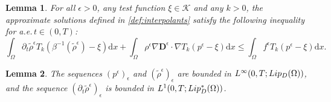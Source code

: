 \documentclass[10pt,a4paper]{amsart}
\newtheorem{lemma}{Lemma}
\newcommand{\K}{\mathcal K}
\newcommand{\Lip}{\textup{Lip}}
\newcommand{\Om}{\Omega}
\newcommand{\dd}{\mathrm{d}}
\newcommand{\de}{\mathbf{D}}
\newcommand{\pp}{a.e.\,}
\begin{document}
\begin{lemma}\label{lem:d-ineq}
	For all $\epsilon>0$, any test function $\xi\in\K$ and any $k>0$, the approximate solutions defined in \cref{def:interpolants} satisfy the following inequality for \pp $t\in (0,T)$:
	\begin{equation}\label{eq:final-discrete-ineq}
    \int_{\Omega} \partial_t \tilde{\rho}^{\epsilon} T_k(\beta^{-1}(\tilde{\rho}^{\epsilon})-\xi) \dd x + \int_{\Omega} \rho^{\epsilon} \nabla \de^{\epsilon} \cdot \nabla T_k(p^{\epsilon}-\xi) \dd x \le \int_{\Omega} f^{\epsilon} T_k(p^{\epsilon}-\xi) \dd x.
\end{equation}
\end{lemma}

\begin{lemma}\label{lem:rho}
    The sequences $(p^\epsilon)_{\epsilon}$ and $(\tilde{\rho}^{\epsilon})_{\epsilon}$ are bounded in $L^{\infty}(0,T; \Lip_{D}(\Omega))$, and the sequence $(\partial_t \tilde{\rho}^{\epsilon})_{\epsilon}$ is bounded in $L^1(0,T; \Lip_{D}^*(\Om))$.
\end{lemma}
\end{document}
